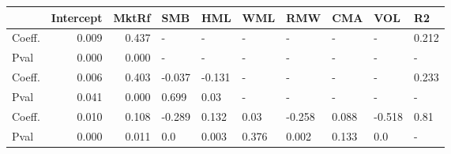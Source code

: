 \begin{tabular}{lrrlllllll}
\toprule
{} &  Intercept &  MktRf &    SMB &    HML &    WML &    RMW &    CMA &    VOL &     R2 \\
\midrule
Coeff.  &      0.009 &  0.437 &      - &      - &      - &      - &      - &      - &  0.212 \\
Pval    &      0.000 &  0.000 &      - &      - &      - &      - &      - &      - &      - \\
Coeff.  &      0.006 &  0.403 & -0.037 & -0.131 &      - &      - &      - &      - &  0.233 \\
Pval    &      0.041 &  0.000 &  0.699 &   0.03 &      - &      - &      - &      - &      - \\
Coeff.  &      0.010 &  0.108 & -0.289 &  0.132 &   0.03 & -0.258 &  0.088 & -0.518 &   0.81 \\
Pval    &      0.000 &  0.011 &    0.0 &  0.003 &  0.376 &  0.002 &  0.133 &    0.0 &      - \\
\bottomrule
\end{tabular}
